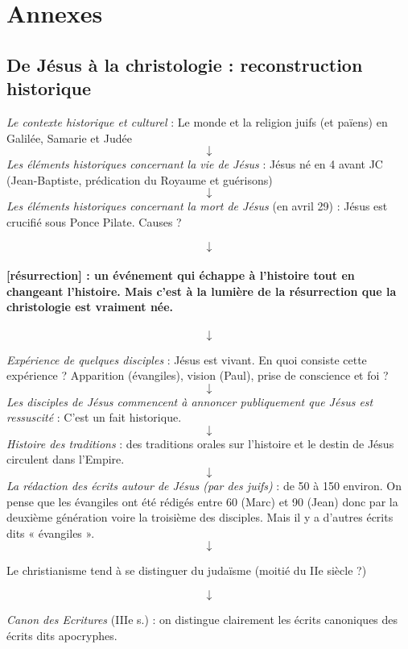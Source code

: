  
 


\section{Annexes}

\subsection{De Jésus à la christologie : reconstruction historique}
 
 
\emph{Le contexte historique et
culturel} : Le monde et la religion juifs (et païens) en Galilée,
Samarie et Judée
$$\downarrow$$
\emph{Les éléments historiques
concernant la vie de Jésus} : Jésus né en 4 avant JC (Jean-Baptiste,
prédication du Royaume et guérisons)
$$\downarrow$$
\emph{Les éléments historiques
concernant la mort de Jésus} (en avril 29) : Jésus est crucifié sous
Ponce Pilate. Causes ?
 
$$\downarrow$$

 
\paragraph{{[}résurrection{]} : un événement qui échappe à l'histoire tout
en changeant l'histoire. Mais c'est à la lumière de la résurrection que
la christologie est vraiment
née.} 
$$\downarrow$$


 
\emph{Expérience de quelques
disciples} : Jésus est vivant. En quoi consiste cette expérience ?
Apparition (évangiles), vision (Paul), prise de conscience et foi ?
$$\downarrow$$
\emph{Les disciples de Jésus commencent à annoncer publiquement que
Jésus est ressuscité} : C'est un fait historique.
$$\downarrow$$
\emph{Histoire des traditions}
: des traditions orales sur l'histoire et le destin de Jésus circulent
dans l'Empire.
 $$\downarrow$$
\emph{La rédaction des écrits autour de Jésus (par des juifs)} : de 50 à
150 environ. On pense que les évangiles ont été rédigés entre 60 (Marc)
et 90 (Jean) donc par la deuxième génération voire la troisième des
disciples. Mais il y a d'autres écrits dits « évangiles ».
$$\downarrow$$


Le christianisme tend à se distinguer du judaïsme (moitié du IIe siècle
?)
 
$$\downarrow$$

\emph{Canon des Ecritures} (IIIe s.) : on distingue clairement les
écrits canoniques des écrits dits apocryphes.
 
 
